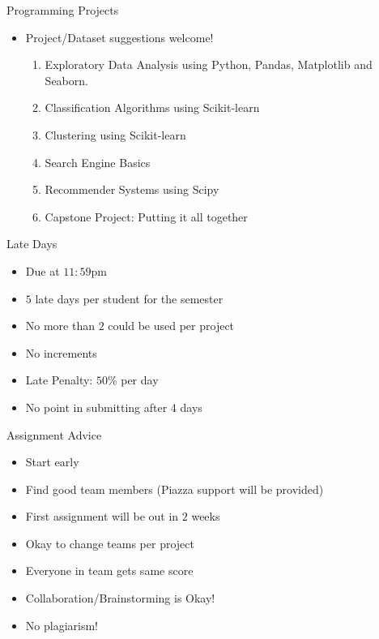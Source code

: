 \documentclass{beamer}
\begin{document}
\begin{frame}{Programming Projects}
    \begin{itemize}
        \item Project/Dataset suggestions welcome!
        \begin{enumerate}
           \item Exploratory Data Analysis using Python, Pandas, Matplotlib and Seaborn.
           \item Classification Algorithms using Scikit-learn 
           \item Clustering using Scikit-learn 
           \item Search Engine Basics 
           \item Recommender Systems using Scipy 
           \item Capstone Project: Putting it all together 
        \end{enumerate}
    \end{itemize}
\end{frame}


\begin{frame}{Late Days}
    \begin{itemize}
        \item Due at $11:59$pm 
        \item $5$ late days per student for the semester
        \item No more than $2$ could be used per project
        \item No increments
        \item Late Penalty: $50$\% per day
        \item No point in submitting after 4 days
    \end{itemize}
\end{frame}


\begin{frame}{Assignment Advice}
    \begin{itemize}
        \item Start early
        \item Find good team members (Piazza support will be provided)
        \item First assignment will be out in $2$ weeks
        \item Okay to change teams per project
        \item Everyone in team gets same score
        \item Collaboration/Brainstorming is Okay!
        \item No plagiarism!
    \end{itemize}
\end{frame}
\end{document}
